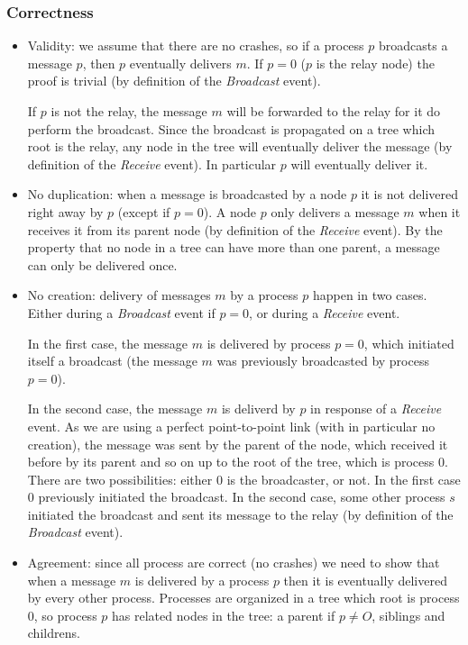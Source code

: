 \documentclass[a4paper]{article}
\begin{document}
\subsubsection*{Correctness}
\begin{itemize}
    \item Validity: we assume that there are no crashes, so if a process $p$
	broadcasts a message $p$, then $p$ eventually delivers $m$. If $p = 0$
	($p$ is the relay node) the proof is trivial (by definition of the
	\textit{Broadcast} event).

	If $p$ is not the relay, the message $m$ will be forwarded to the
	relay for it do perform the broadcast. Since the broadcast is
	propagated on a tree which root is the relay, any node in the tree
	will eventually deliver the message (by definition of the
	\textit{Receive} event). In particular $p$ will eventually deliver it.
    \item No duplication: when a message is broadcasted by a node $p$ it is not
	delivered right away by $p$ (except if $p = 0$). A node $p$ only
	delivers a message $m$ when it receives it from its parent node (by
	definition of the \textit{Receive} event). By the property that no
	node in a tree can have more than one parent, a message can only be
	delivered once.
    \item No creation: delivery of messages $m$ by a process $p$ happen in two
	cases. Either during a \textit{Broadcast} event if $p=0$, or during a
	\textit{Receive} event.

	In the first case, the message $m$ is delivered by process $p=0$, which
	initiated itself a broadcast (the message $m$ was previously
	broadcasted by process $p=0$).

	In the second case, the message $m$ is deliverd by $p$ in response of
	a \textit{Receive} event. As we are using a perfect point-to-point
	link (with in particular no creation), the message was sent by the
	parent of the node, which received it before by its parent and so on
	up to the root of the tree, which is process $0$. There are two
	possibilities: either $0$ is the broadcaster, or not. In the first
	case $0$ previously initiated the broadcast. In the second case, some
	other process $s$ initiated the broadcast and sent its message to the
	relay (by definition of the \textit{Broadcast} event).
    \item Agreement: since all process are correct (no crashes) we need to
	show that when a message $m$ is delivered by a process $p$ then it is
	eventually delivered by every other process. Processes are organized
	in a tree which root is process $0$, so process $p$ has related nodes
	in the tree: a parent if $p \neq O$, siblings and childrens.


\end{itemize}
\end{document}
